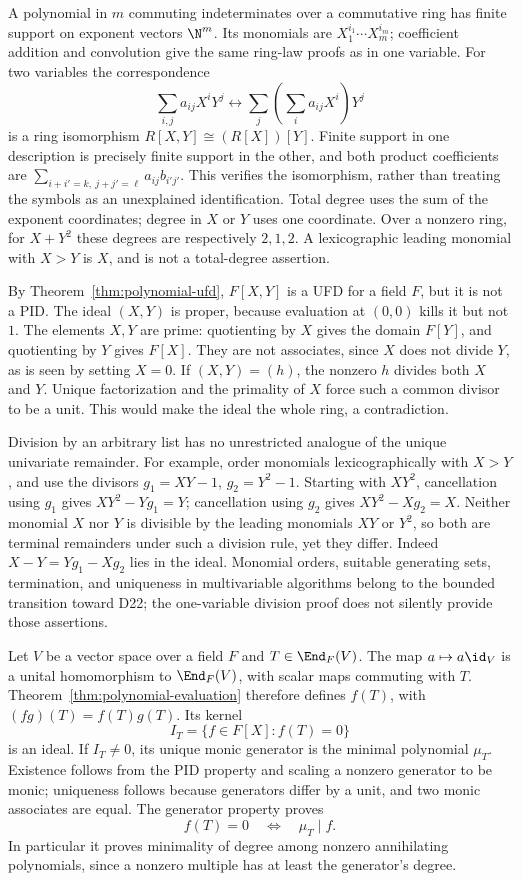 A polynomial in $m$ commuting indeterminates over a commutative ring
has finite support on exponent vectors $\N^m$. Its monomials are
$X_1^{i_1}\cdots X_m^{i_m}$; coefficient addition and convolution
give the same ring-law proofs as in one variable.
For two variables the correspondence
\[
 \sum_{i,j}a_{ij}X^iY^j
 \longleftrightarrow
 \sum_j\left(\sum_i a_{ij}X^i\right)Y^j
\]
is a ring isomorphism $R[X,Y]\cong(R[X])[Y]$.
Finite support in one description is precisely finite support
in the other, and both product coefficients are
$\sum_{i+i'=k,\ j+j'=\ell}a_{ij}b_{i'j'}$.
This verifies the isomorphism, rather than treating the symbols
as an unexplained identification.
Total degree uses the sum of the exponent coordinates; degree
in $X$ or $Y$ uses one coordinate. Over a nonzero ring, for $X+Y^2$ these degrees
are respectively $2,1,2$. A lexicographic leading monomial with
$X>Y$ is $X$, and is not a total-degree assertion.

By Theorem~\ref{thm:polynomial-ufd}, $F[X,Y]$ is a UFD for a field
$F$, but it is not a PID. The ideal $(X,Y)$ is proper, because
evaluation at $(0,0)$ kills it but not $1$.
The elements $X,Y$ are prime: quotienting by $X$ gives the domain
$F[Y]$, and quotienting by $Y$ gives $F[X]$.
They are not associates, since $X$ does not divide $Y$, as is
seen by setting $X=0$. If $(X,Y)=(h)$, the nonzero $h$ divides
both $X$ and $Y$. Unique factorization and the primality of $X$
force such a common divisor to be a unit. This would make the
ideal the whole ring, a contradiction.

Division by an arbitrary list has no unrestricted analogue of the
unique univariate remainder. For example, order monomials
lexicographically with $X>Y$, and use the divisors
$g_1=XY-1$, $g_2=Y^2-1$. Starting with $XY^2$, cancellation
using $g_1$ gives
$XY^2-Yg_1=Y$; cancellation using $g_2$ gives
$XY^2-Xg_2=X$. Neither monomial $X$ nor $Y$ is divisible
by the leading monomials $XY$ or $Y^2$, so both are terminal
remainders under such a division rule, yet they differ.
Indeed $X-Y=Yg_1-Xg_2$ lies in the ideal.
Monomial orders, suitable generating sets, termination,
and uniqueness in multivariable algorithms belong to the
bounded transition toward D22; the one-variable division proof
does not silently provide those assertions.

Let $V$ be a vector space over a field $F$ and $T\in\End_F(V)$.
The map $a\mapsto a\id_V$ is a unital homomorphism to
$\End_F(V)$, with scalar maps commuting with $T$.
Theorem~\ref{thm:polynomial-evaluation} therefore defines $f(T)$,
with $(fg)(T)=f(T)g(T)$. Its kernel
\[
 I_T=\{f\in F[X]:f(T)=0\}
\]
is an ideal. If $I_T\ne0$, its unique monic generator is the
minimal polynomial $\mu_T$. Existence follows from the PID
property and scaling a nonzero generator to be monic; uniqueness
follows because generators differ by a unit, and two monic
associates are equal. The generator property proves
\[
 f(T)=0\quad\Longleftrightarrow\quad \mu_T\mid f.
\]
In particular it proves minimality of degree among nonzero
annihilating polynomials, since a nonzero multiple has at least
the generator's degree.


